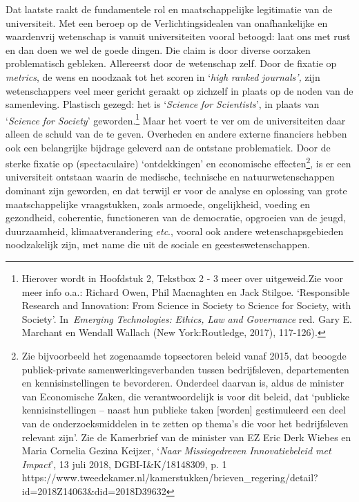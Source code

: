 \documentclass[smallauthor, chapterhaspagenum, nochapterinheader, pagenuminheader,  bigchapnum,medium2, tocpages,  garamond, titleinheader]{jote-book}
\begin{document}
	Dat laatste raakt de fundamentele rol en maatschappelijke legitimatie van de universiteit. Met een beroep op de Verlichtingsidealen van onafhankelijke en waardenvrij wetenschap is vanuit universiteiten vooral betoogd: laat ons met rust en dan doen we wel de goede dingen. Die claim is door diverse oorzaken problematisch gebleken. Allereerst door de wetenschap zelf. Door de fixatie op \emph{metrics}, de wens en noodzaak tot het scoren in ‘\emph{high }\emph{ranked}\emph{ }\emph{journals}\emph{'}\emph{, }zijn wetenschappers veel meer gericht geraakt op zichzelf in plaats op de noden van de samenleving. Plastisch gezegd: het is ‘\emph{Science}\emph{ }\emph{for}\emph{ }\emph{Scientists}', in plaats van ‘\emph{Science}\emph{ }\emph{for}\emph{ Society}' geworden.\footnote{Hierover wordt in Hoofdstuk 2, Tekstbox 2 - 3 meer over uitgeweid.Zie voor meer info o.a.: Richard Owen, Phil Macnaghten en Jack Stilgoe. ‘Responsible Research and Innovation: From Science in Society to Science for Society, with Society'. In \emph{Emerging}\emph{ Technologies: }\emph{Ethics}\emph{, }\emph{Law}\emph{ }\emph{and}\emph{ }\emph{Governance} red. Gary E. Marchant en Wendall Wallach (New York:Routledge, 2017), 117-126). } Maar het voert te ver om de universiteiten daar alleen de schuld van de te geven. Overheden en andere externe financiers hebben ook een belangrijke bijdrage geleverd aan de ontstane problematiek. Door de sterke fixatie op (spectaculaire) ‘ontdekkingen' en economische effecten\footnote{Zie bijvoorbeeld het zogenaamde topsectoren beleid vanaf 2015, dat beoogde publiek-private samenwerkingsverbanden tussen bedrijfsleven, departementen en kennisinstellingen te bevorderen. Onderdeel daarvan is, aldus de minister van Economische Zaken, die verantwoordelijk is voor dit beleid, dat ‘publieke kennisinstellingen -- naast hun publieke taken [worden] gestimuleerd een deel van de onderzoeksmiddelen in te zetten op thema's die voor het bedrijfsleven relevant zijn'. Zie de Kamerbrief van de minister van EZ Eric Derk Wiebes en Maria Cornelia Gezina Keijzer, ‘\emph{Naar }\emph{Missiegedreven}\emph{ Innovatiebeleid met Impact}', 13 juli 2018, DGBI-I\&K/18148309, p. 1 https://www.tweedekamer.nl/kamerstukken/brieven\_regering/detail?id=2018Z14063\&did=2018D39632}, is er een universiteit ontstaan waarin de medische, technische en natuurwetenschappen dominant zijn geworden, en dat terwijl er voor de analyse en oplossing van grote maatschappelijke vraagstukken, zoals armoede, ongelijkheid, voeding en gezondheid, coherentie, functioneren van de democratie, opgroeien van de jeugd, duurzaamheid, klimaatverandering \emph{etc}., vooral ook andere wetenschapsgebieden noodzakelijk zijn, met name die uit de sociale en geesteswetenschappen.
\end{document}

